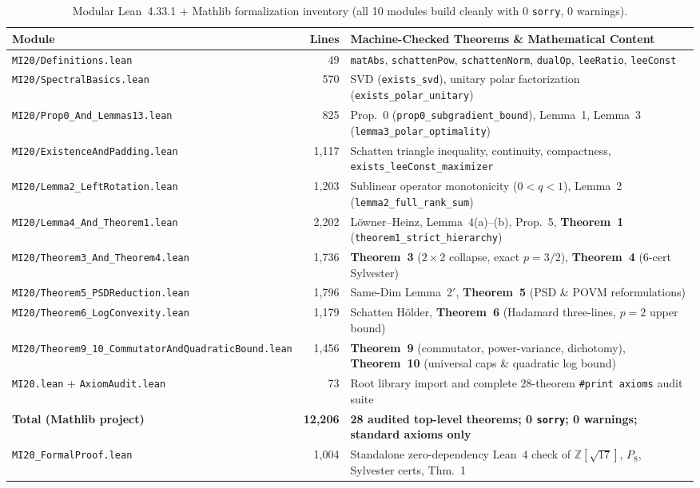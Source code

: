 \documentclass[10pt,letterpaper]{article}
\begin{document}
\begin{table}[htbp]
\centering
\caption{\small Modular Lean~4.33.1 + Mathlib formalization inventory (all 10 modules build cleanly with 0 \texttt{sorry}, 0 warnings).}
\vspace{3pt}
\footnotesize
\setlength{\tabcolsep}{4.5pt}
\begin{tabular}{@{}l r >{\raggedright\arraybackslash}p{8.4cm}@{}}
\toprule
\textbf{Module} & \textbf{Lines} & \textbf{Machine-Checked Theorems \& Mathematical Content} \\
\midrule
\texttt{MI20/Definitions.lean}           &    49 & \texttt{matAbs}, \texttt{schattenPow}, \texttt{schattenNorm}, \texttt{dualOp}, \texttt{leeRatio}, \texttt{leeConst} \\
\texttt{MI20/SpectralBasics.lean}        &   570 & SVD (\texttt{exists\_svd}), unitary polar factorization (\texttt{exists\_polar\_unitary}) \\
\texttt{MI20/Prop0\_And\_Lemmas13.lean}  &   825 & Prop.~0 (\texttt{prop0\_subgradient\_bound}), Lemma~1, Lemma~3 (\texttt{lemma3\_polar\_optimality}) \\
\texttt{MI20/ExistenceAndPadding.lean}   & 1,117 & Schatten triangle inequality, continuity, compactness, \texttt{exists\_leeConst\_maximizer} \\
\texttt{MI20/Lemma2\_LeftRotation.lean}  & 1,203 & Sublinear operator monotonicity ($0<q<1$), Lemma~2 (\texttt{lemma2\_full\_rank\_sum}) \\
\texttt{MI20/Lemma4\_And\_Theorem1.lean} & 2,202 & L\"owner--Heinz, Lemma~4(a)--(b), Prop.~5, \textbf{Theorem~1} (\texttt{theorem1\_strict\_hierarchy}) \\
\texttt{MI20/Theorem3\_And\_Theorem4.lean}& 1,736 & \textbf{Theorem~3} ($2\times 2$ collapse, exact $p=3/2$), \textbf{Theorem~4} (6-cert Sylvester) \\
\texttt{MI20/Theorem5\_PSDReduction.lean}& 1,796 & Same-Dim Lemma~2$'$, \textbf{Theorem~5} (PSD \& POVM reformulations) \\
\texttt{MI20/Theorem6\_LogConvexity.lean}& 1,179 & Schatten H\"older, \textbf{Theorem~6} (Hadamard three-lines, $p=2$ upper bound) \\
\texttt{MI20/Theorem9\_10\_CommutatorAnd\allowbreak QuadraticBound.lean} & 1,456 & \textbf{Theorem~9} (commutator, power-variance, dichotomy), \textbf{Theorem~10} (universal caps \& quadratic log bound) \\
\texttt{MI20.lean} + \texttt{AxiomAudit.lean} & 73 & Root library import and complete 28-theorem \texttt{\#print axioms} audit suite \\
\midrule
\textbf{Total (Mathlib project)}         & \textbf{12,206} & \textbf{28 audited top-level theorems; 0 \texttt{sorry}; 0 warnings; standard axioms only} \\
\texttt{MI20\_FormalProof.lean}          &  1,004 & Standalone zero-dependency Lean~4 check of $\mathbb{Z}[\sqrt{17}]$, $P_8$, Sylvester certs, Thm.~1 \\
\bottomrule
\end{tabular}
\label{tab:lean}
\end{table}
\end{document}
